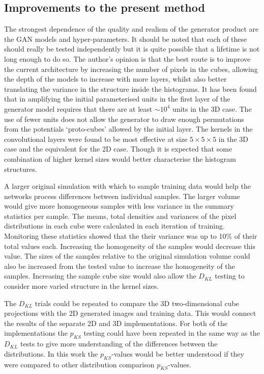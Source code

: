 \documentclass[twocolumn]{article}
\numberwithin{equation}{section}
\begin{document}
\subsection{Improvements to the present method}
The strongest dependence of the quality and realism of the generator product are the GAN models and hyper-parameters. It should be noted that each of these should really be tested independently but it is quite possible that a lifetime is not long enough to do so. The author's opinion is that the best route is to improve the current architecture by increasing the number of pixels in the cubes, allowing the depth of the models to increase with more layers, whilst also better translating the variance in the structure inside the histograms. It has been found that in amplifying the initial parameterised units in the first layer of the generator model requires that there are at least $\sim \! 10^4$ units in the 3D case. The use of fewer units does not allow the generator to draw enough permutations from the potentials  `proto-cubes' allowed by the initial layer. The kernels in the convolutional layers were found to be most effective at size $5 \times 5 \times 5$ in the 3D case and the equivalent for the 2D case. Though it is expected that some combination of higher kernel sizes would better characterise the histogram structures. 

A larger original simulation with which to sample training data would help the networks process differences between individual samples. The larger volume would give more homogeneous samples with less variance in the summary statistics per sample. The means, total densities and variances of the pixel distributions in each cube were calculated in each iteration of training. Monitoring these statistics showed that the their variance was up to 10\% of their total values each. Increasing the homogeneity of the samples would decrease this value. The sizes of the samples relative to the original simulation volume could also be increased from the tested value to increase the homogeneity of the samples. Increasing the sample cube size would also allow the $D_{KL}$ testing to consider more varied structure in the kernel sizes. 

The $D_{KL}$ trials could be repeated to compare the 3D two-dimensional cube projections with the 2D generated images and training data. This would connect the results of the separate 2D and 3D implementations. For both of the implementations the $p_{KS}$ testing could have been repeated in the same way as the $D_{KL}$ tests to give more understanding of the differences between the distributions. In this work the $p_{KS}$-values would be better understood if they were compared to other distribution comparison $p_{KS}$-values.
\end{document}

